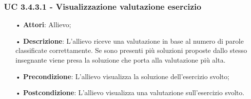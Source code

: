 \subsubsection{UC 3.4.3.1 - Visualizzazione valutazione esercizio}  %

\begin{itemize}
\item[•]\textbf{Attori}: Allievo;
\item[•]\textbf{Descrizione}: L'allievo riceve una valutazione in base al numero di parole classificate correttamente. Se sono presenti più soluzioni proposte dallo stesso insegnante viene presa la soluzione che porta alla valutazione più alta.
\item[•]\textbf{Precondizione}: L'allievo visualizza la soluzione dell'esercizio svolto;
\item[•]\textbf{Postcondizione}: L'allievo visualizza una valutazione sull'esercizio svolto.
\end{itemize}


